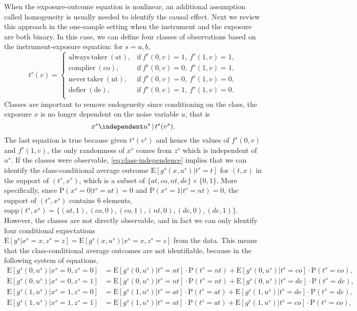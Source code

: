 \documentclass[preprint]{imsart}
\begin{document}
When the exposure-outcome equation is nonlinear, an additional
assumption called homogeneity is usually needed to identify the causal
effect. Next we review this approach in the one-sample setting when
the instrument and the exposure are both binary. In this case, we can
define four classes of
observations based on the instrument-exposure equation: for $s = a,b$,
\[
t^s(v) =
\begin{cases}
  \mathrm{always~taker~(at)}, & \mathrm{if}~f^s(0,v) = 1,~f^s(1,v)=1,
  \\
  \mathrm{complier~(co)}, & \mathrm{if}~f^s(0,v) = 0,~f^s(1,v)=1, \\
  \mathrm{never~taker~(nt)}, & \mathrm{if}~f^s(0,v) = 0,~f^s(1,v)=0, \\
  \mathrm{defier~(de)}, & \mathrm{if}~f^s(0,v) = 1,~f^s(1,v)=0. \\
\end{cases}
\]
Classes are important to remove endogeneity since conditioning on the
class, the exposure $x$ is no longer dependent on the noise variable
$u$, that is
\begin{equation}
  \label{eq:class-independence}
  x^s \independent u^s \, | \, t^s(v^s).
\end{equation}
The last equation is true because given $t^s(v^s)$ and hence
the values of $f^s(0,v)$ and $f^s(1,v)$, the only randomness of $x^s$
comes from $z^s$ which is independent of $u^s$. If the classes were
observable, \eqref{eq:class-independence} implies that we can identify
the class-conditional average outcome $\mathrm{E}[g^s(x,u^s)|t^s=t]$
for $(t,x)$ in the support of $(t^s,x^s)$,
which is a subset of $\{at,co,nt,de\} \times \{0, 1\}$. More
specifically, since $\mathrm{P}(x^s=0|t^s=at) = 0$ and
$\mathrm{P}(x^s=1|t^s=nt) = 0$, the support of $(t^s,x^s)$ contains
$6$ elements,
$\mathrm{supp}(t^s,x^s)=\{(at,1),(co,0),(co,1),(nt,0),(de,0),(de,1)\}$. However,
the classes are not directly observable, and in fact we can only identify
four conditional expectations $\mathrm{E}[y^s|x^s=x,z^s=z] =
\mathrm{E}[g^s(x,u^s)|x^s=x,z^s=z]$ from the data. This means that the
class-conditional average outcomes are not identifiable, because in the
following system of equations,
\begin{equation} \label{eq:class-ate-identification}
  \begin{split}
    \mathrm{E}[g^s(0,u^s)|x^s=0,z^s=0] &= \mathrm{E}[g^s(0,u^s)|t^s = nt] \cdot
    \mathrm{P}(t^s = nt) + \mathrm{E}[g^s(0,u^s)|t^s = co] \cdot
    \mathrm{P}(t^s = co), \\
    \mathrm{E}[g^s(0,u^s)|x^s=0,z^s=1] &= \mathrm{E}[g^s(0,u^s)|t^s = nt] \cdot
    \mathrm{P}(t^s = nt) + \mathrm{E}[g^s(0,u^s)|t^s = de] \cdot
    \mathrm{P}(t^s = de), \\
    \mathrm{E}[g^s(1,u^s)|x^s=1,z^s=0] &= \mathrm{E}[g^s(1,u^s)|t^s = at] \cdot
    \mathrm{P}(t^s = at) + \mathrm{E}[g^s(1,u^s)|t^s = de] \cdot
    \mathrm{P}(t^s = de), \\
    \mathrm{E}[g^s(1,u^s)|x^s=1,z^s=1] &= \mathrm{E}[g^s(1,u^s)|t^s = at] \cdot
    \mathrm{P}(t^s = at) + \mathrm{E}[g^s(1,u^s)|t^s = co] \cdot
    \mathrm{P}(t^s = co),
  \end{split}
\end{equation}
\end{document}
